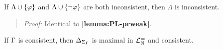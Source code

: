 \begin{Lthm} \label{lemma:FOL-conin}
  If $\Lambda \cup \lbrace\varphi\rbrace$ and $\Lambda\cup \lbrace\neg\varphi\rbrace$ are both inconsistent, then $\Lambda$ is inconsistent. 
\end{Lthm}

\begin{quote} 
  \textit{Proof:}
  Identical to \textbf{\ref{lemma:PL-prweak}}.
\end{quote}





\begin{Lthm} \label{lemma:FOL-max}
  If $\Gamma$ is consistent, then $\Delta_{\Sigma_{\Gamma}}$ is maximal in $\mathcal{L}^{=}_{\mathbb{N}}$ and consistent. 
\end{Lthm}

